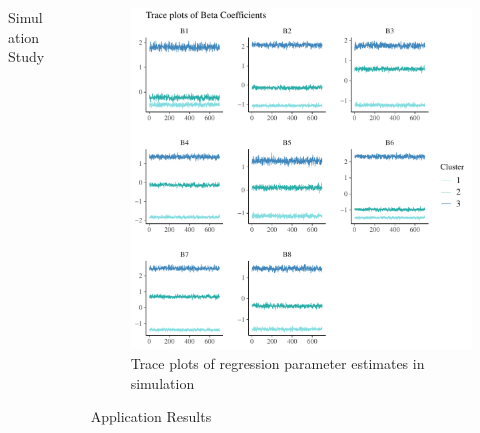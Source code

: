 \documentclass[final]{beamer}
\newlength{\sepwid}
\newlength{\onecolwid}
\newlength{\twocolwid}
\begin{document}
\begin{frame}[t]
\begin{columns}[t]
\begin{column}{\twocolwid}
\begin{columns}[t,totalwidth=\twocolwid]
\begin{column}{\onecolwid}
\begin{block}{Simulation Study}
\end{block}


\end{column} %

\end{columns} %

\end{column} %

\begin{column}{\sepwid}\end{column} %

\begin{column}{\onecolwid} %


\begin{figure}
\includegraphics[height=0.9\linewidth,width=1\linewidth]{beta_trace.pdf}
\caption{Trace plots of regression parameter estimates in simulation}
\end{figure}

\begin{block}{Application Results}


\end{block}
\end{column}
\end{columns}
\end{frame}
\end{document}
